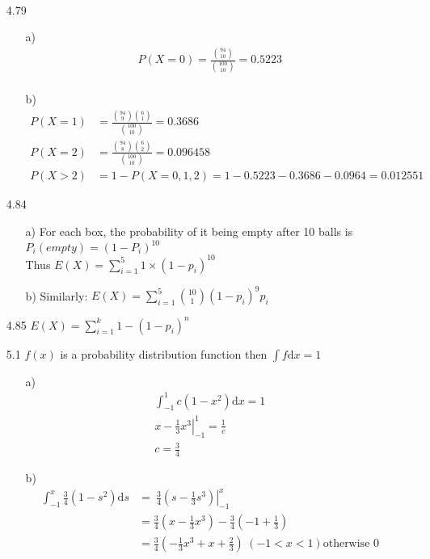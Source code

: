 \documentclass{article}
\begin{document}
\begin{itemize}
\begin{align*}
    \end{align*}
    \item [4.79]
    \begin{itemize}
        \item [a)]
        \begin{align*}
            P(X=0) = \frac{\binom{94}{10}}{\binom{100}{10}} = 0.5223\\
        \end{align*}
        \item [b)]
        \begin{align*}
            P(X=1) &= \frac{\binom{94}{9}\binom{6}{1}}{\binom{100}{10}}=0.3686\\
            P(X=2) &= \frac{\binom{94}{8}\binom{6}{2}}{\binom{100}{10}}=0.096458\\
            P(X>2) &=1-P(X=0,1,2) = 1 - 0.5223 - 0.3686 - 0.0964 = 0.012551
        \end{align*}
    \end{itemize}
    \item [4.84]
    \begin{itemize}
        \item [a)]
        For each box, the probability of it being empty after 10 balls is \(P_i(empty) = (1-P_i)^{10}\)\\
        Thus \(E(X) = \sum_{i=1}^{5}1\times(1-p_i)^{10}\)
        \item [b)]
        Similarly: \(E(X) = \sum_{i=1}^{5}\binom{10}{1}(1-p_i)^{9}p_i\)
    \end{itemize}
    \item [4.85] \(E(X) = \sum_{i=1}^{k}1-(1-p_i)^n\)
    \item [5.1] \(f(x)\) is a probability distribution function then \(\int f \text{d}x = 1\)
    \begin{itemize}
        \item [a)]    \begin{align*}
            \int_{-1}^{1} c(1-x^2) \text{d}x = 1\\
            \left.x-\frac{1}{3}x^3\right|^{1}_{-1}=\frac{1}{c}\\
            c = \frac{3}{4}
        \end{align*}
        \item [b)]
        \begin{align*}
            \int^x_{-1}\frac{3}{4}(1-s^2)\text{d}s&=\
            \frac{3}{4}\left.(s-\frac{1}{3}s^3)\right|^x_{-1}\\
            &=\frac{3}{4}(x-\frac{1}{3}x^3)-\frac{3}{4}(-1+\frac{1}{3})\\
            &=\frac{3}{4}(-\frac{1}{3}x^3+x+\frac{2}{3})\  (-1<x<1) \text{otherwise 0}
        \end{align*}
    \end{itemize}


\end{itemize}
\end{document}
